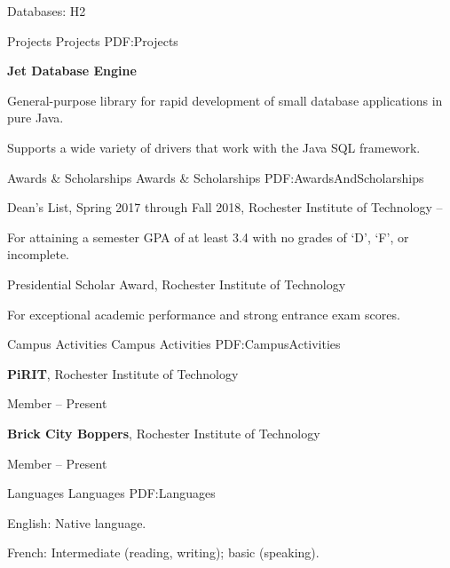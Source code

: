 \documentclass[letterpaper,MMMyyyy,nonstopmode]{simpleresumecv}
\begin{document}
\begin{Body}
\BulletItem
Databases:
H2


\Section
{Projects}
{Projects}
{PDF:Projects}

\Entry
\textbf{Jet Database Engine}

\BulletItem
General-purpose library for rapid development of small database applications
in pure Java.

\Gap
\BulletItem
Supports a wide variety of drivers that work with the Java SQL framework.


\Section
{Awards \&\newline
Scholarships}
{Awards \& Scholarships}
{PDF:AwardsAndScholarships}

\BulletItem
Dean's List,
Spring 2017 through Fall 2018,
Rochester Institute of Technology
\hfill
{} --
\begin{Detail}
\Item
For attaining a semester GPA of at least 3.4 with no grades of `D', `F', or
incomplete.
\end{Detail}

\Gap
\BulletItem
Presidential Scholar Award,
Rochester Institute of Technology
\hfill
{}
\begin{Detail}
\Item
For exceptional academic performance and strong entrance exam scores.
\end{Detail}


\Section
{Campus Activities}
{Campus Activities}
{PDF:CampusActivities}

\Entry
{\textbf{PiRIT}},
Rochester Institute of Technology

\Gap
\BulletItem
Member
\hfill
{} --
Present

\Entry
{\textbf{Brick City Boppers}},
Rochester Institute of Technology

\Gap
\BulletItem
Member
\hfill
{} --
Present


\Section
{Languages}
{Languages}
{PDF:Languages}

\BulletItem
English: Native language.

\Gap
\BulletItem
French: Intermediate (reading, writing); basic (speaking).


\end{Body}
\end{document}

